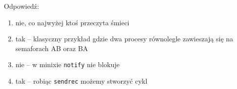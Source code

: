Odpowiedź:
\begin{enumerate}
	\item nie, co najwyżej ktoś przeczyta śmieci
	\item tak -- klasyczny przykład gdzie dwa procesy równolegle zawieszają się na semaforach AB oraz BA
	\item nie -- w minixie \texttt{notify} nie blokuje
	\item tak -- robiąc \texttt{sendrec} możemy stworzyć cykl
\end{enumerate}